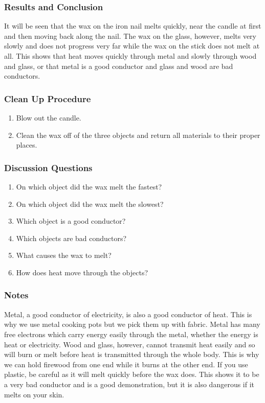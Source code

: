\subsubsection*{Results and Conclusion}
It will be seen that the wax on the iron nail melts quickly, near the candle at first and then moving back along the nail. The wax on the glass, however, melts very slowly and does not progress very far while the wax on the stick does not melt at all.  
This shows that heat moves quickly through metal and slowly through wood and glass, or that metal is a good conductor and glass and wood are bad conductors.  

\subsubsection*{Clean Up Procedure}
\begin{enumerate}
\item{Blow out the candle.} 
\item{Clean the wax off of the three objects and return all materials to their proper places.} 
\end{enumerate}

\subsubsection*{Discussion Questions}
\begin{enumerate}
\item{On which object did the wax melt the fastest?}
\item{On which object did the wax melt the slowest?}
\item{Which object is a good conductor?}
\item{Which objects are bad conductors?}
\item{What causes the wax to melt?}
\item{How does heat move through the objects?}
\end{enumerate}

\subsubsection*{Notes}
Metal, a good conductor of electricity, is also a good conductor of heat. This is why we use metal cooking pots but we pick them up with fabric. Metal has many free electrons which carry energy easily through the metal, whether the energy is heat or electricity. Wood and glass, however, cannot transmit heat easily and so will burn or melt before heat is transmitted through the whole body. This is why we can hold firewood from one end while it burns at the other end.  
If you use plastic, be careful as it will melt quickly before the wax does. This shows it to be a very bad conductor and is a good demonstration, but it is also dangerous if it melts on your skin.  

